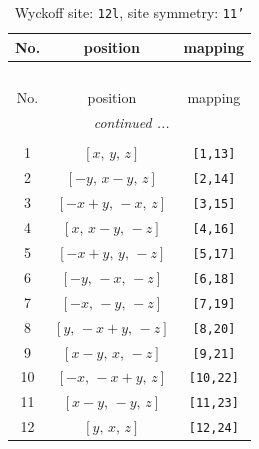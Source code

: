 \documentclass[fleqn,8pt]{jsarticle}
\begin{document}
\begin{longtable}{ccc}
\caption{Wyckoff site: {\tt 12l}, site symmetry: {\tt 11'}}
 \\
 \hline \hline
No. & position & mapping \\ \hline \endfirsthead

\multicolumn{2}{l}{\tablename\ \thetable{}} \\
 \hline \hline
No. & position & mapping \\ \hline \endhead

 \hline \hline
\multicolumn{2}{r}{\footnotesize\it continued ...} \\ \endfoot

 \hline \hline
\multicolumn{2}{r}{} \\ \endlastfoot

1 & $\left[ x,\, y,\, z \right]$ & {\tt [1,13]} \\ \hline
2 & $\left[ - y,\, x - y,\, z \right]$ & {\tt [2,14]} \\ \hline
3 & $\left[ - x + y,\, - x,\, z \right]$ & {\tt [3,15]} \\ \hline
4 & $\left[ x,\, x - y,\, - z \right]$ & {\tt [4,16]} \\ \hline
5 & $\left[ - x + y,\, y,\, - z \right]$ & {\tt [5,17]} \\ \hline
6 & $\left[ - y,\, - x,\, - z \right]$ & {\tt [6,18]} \\ \hline
7 & $\left[ - x,\, - y,\, - z \right]$ & {\tt [7,19]} \\ \hline
8 & $\left[ y,\, - x + y,\, - z \right]$ & {\tt [8,20]} \\ \hline
9 & $\left[ x - y,\, x,\, - z \right]$ & {\tt [9,21]} \\ \hline
10 & $\left[ - x,\, - x + y,\, z \right]$ & {\tt [10,22]} \\ \hline
11 & $\left[ x - y,\, - y,\, z \right]$ & {\tt [11,23]} \\ \hline
12 & $\left[ y,\, x,\, z \right]$ & {\tt [12,24]} \\
\end{longtable}
\end{document}
